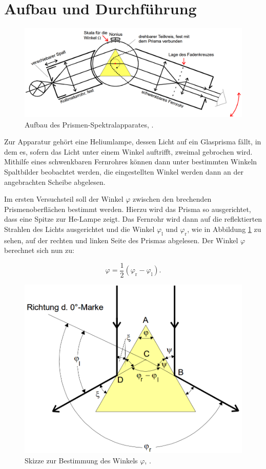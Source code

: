 \section{Aufbau und Durchführung}

\begin{figure}[h!tbp]
	\centering
	\includegraphics[width=0.7\linewidth]{aufbau}
	\caption{Aufbau des Prismen-Spektralapparates, \cite[9]{anleitungV402}.}
	\label{fig:aufbau}
\end{figure}

Zur Apparatur gehört eine Heliumlampe, dessen Licht auf ein Glasprisma fällt, in dem es, sofern das Licht unter einem Winkel auftrifft, zweimal gebrochen wird. Mithilfe eines schwenkbaren Fernrohres können dann unter bestimmten Winkeln Spaltbilder 
beobachtet werden, die eingestellten Winkel werden dann an der angebrachten Scheibe abgelesen.

Im ersten Versuchsteil soll der Winkel $\varphi$ zwischen den brechenden Prismenoberflächen bestimmt werden. Hierzu wird das Prisma so ausgerichtet, dass eine Spitze zur He-Lampe zeigt. Das Fernrohr wird dann auf die reflektierten Strahlen des Lichts
ausgerichtet und die Winkel $\varphi_{\text{l}}$ und $\varphi_{\text{r}}$, wie in Abbildung \ref{fig:aufbau} zu sehen, auf der rechten und linken Seite des Prismas abgelesen.
Der Winkel $\varphi$ berechnet sich nun zu:

\begin{equation}
\label{eq:varphi}
\varphi = \frac{1}{2} (\varphi_{\text{r}} - \varphi_{\text{l}}).
\end{equation}

\begin{figure}[h!tbp]
	\centering
	\includegraphics[width=0.7\linewidth]{phi}
	\caption{Skizze zur Bestimmung des Winkels $\varphi$, \cite[11]{anleitungV402}.}
	\label{fig:phi}
\end{figure}

